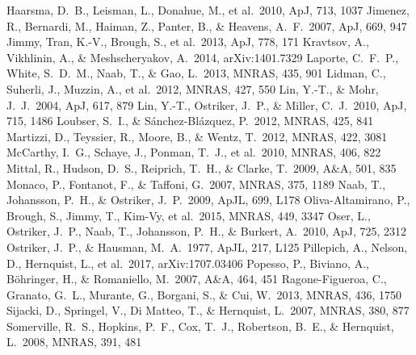 \documentclass[
12pt, %
spanish,
singlespacing, %
headsepline, %
]{MastersDoctoralThesis} %
\def\apj {ApJ}
\def\apjl {ApJL}
\def\aap {A\&A}
\def\mnras {MNRAS}
\def\apj {ApJ}
\begin{document}
\begin{thebibliography}{X}
    Haarsma, D.~B., Leisman, L., Donahue, M., et al.\ 2010, \apj, 713, 1037 
    Jimenez, R., Bernardi, M., Haiman, Z., Panter, B., \& Heavens, A.~F.\ 2007, \apj, 669, 947 
    Jimmy, Tran, K.-V., Brough, S., et al.\ 2013, \apj, 778, 171 
    Kravtsov, A., Vikhlinin, A., \& Meshscheryakov, A.\ 2014, arXiv:1401.7329
    Laporte, C.~F.~P., White, S.~D.~M., Naab, T., \& Gao, L.\ 2013, \mnras, 435, 901 
    Lidman, C., Suherli, J., Muzzin, A., et al.\ 2012, \mnras, 427, 550 
    Lin, Y.-T., \& Mohr, J.~J.\ 2004, \apj, 617, 879 
    Lin, Y.-T., Ostriker, J.~P., \& Miller, C.~J.\ 2010, \apj, 715, 1486 
    Loubser, S.~I., \& S{\'a}nchez-Bl{\'a}zquez, P.\ 2012, \mnras, 425, 841 
    Martizzi, D., Teyssier, R., Moore, B., \& Wentz, T.\ 2012, \mnras, 422, 3081 
    McCarthy, I.~G., Schaye, J., Ponman, T.~J., et al.\ 2010, \mnras, 406, 822 
    Mittal, R., Hudson, D.~S., Reiprich, T.~H., \& Clarke, T.\ 2009, \aap, 501, 835 
    Monaco, P., Fontanot, F., \& Taffoni, G.\ 2007, \mnras, 375, 1189 
    Naab, T., Johansson, P.~H., \& Ostriker, J.~P.\ 2009, \apjl, 699, L178 
    Oliva-Altamirano, P., Brough, S., Jimmy, T., Kim-Vy, et al.\ 2015, \mnras, 449, 3347 
    Oser, L., Ostriker, J.~P., Naab, T., Johansson, P.~H., \& Burkert, A.\ 2010, \apj, 725, 2312 
    Ostriker, J.~P., \& Hausman, M.~A.\ 1977, \apjl, 217, L125 
    Pillepich, A., Nelson, D., Hernquist, L., et al.\ 2017, arXiv:1707.03406 
    Popesso, P., Biviano, A., B{\"o}hringer, H., \& Romaniello, M.\ 2007, \aap, 464, 451 
    Ragone-Figueroa, C., Granato, G.~L., Murante, G., Borgani, S., \& Cui, W.\ 2013, \mnras, 436, 1750 
    Sijacki, D., Springel, V., Di Matteo, T., \& Hernquist, L.\ 2007, \mnras, 380, 877 
    Somerville, R.~S., Hopkins, P.~F., Cox, T.~J., Robertson, B.~E., \& Hernquist, L.\ 2008, \mnras, 391, 481 

\end{thebibliography}
\end{document}
